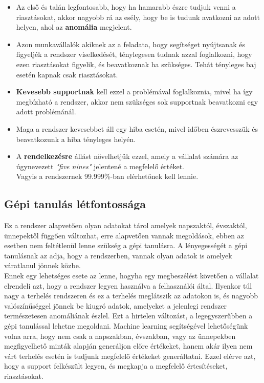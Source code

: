 \begin{itemize}
	\item Az első és talán legfontosabb, hogy ha hamarabb észre tudjuk venni a riasztásokat, akkor nagyobb rá az esély, hogy be is tudunk avatkozni az adott helyen, ahol az \textbf{anomália} megjelent.
	\item Azon munkavállalók akiknek az a feladata, hogy segítséget nyújtsanak és figyeljék a rendszer viselkedését, ténylegesen tudnak azzal foglalkozni, hogy ezen riasztásokat figyelik, és beavatkoznak ha szükséges. Tehát tényleges baj esetén kapnak csak riasztásokat.
	\item \textbf{Kevesebb supportnak} kell ezzel a problémával foglalkoznia, mivel ha így megbízható a rendszer, akkor nem szükséges sok supportnak beavatkozni egy adott problémánál.
	\item Maga a rendszer kevesebbet áll egy hiba esetén, mivel időben észrevesszük és beavatkozunk a hiba tényleges helyén.
	\item A \textbf{rendelkezésre} állást növelhetjük ezzel, amely a vállalat számára az úgynevezett \textit{"five nines"} jelentené a megfelelő értéket. \\
	Vagyis a rendszernek 99.999\%-ban elérhetőnek kell lennie.
\end{itemize}

\subsection{Gépi tanulás létfontossága}
Ez a rendszer alapvetően olyan adatokat tárol amelyek napszaktól, évszaktól, ünnepektől függően változhat, erre alapvetően vannak megoldások, ebben az esetben nem feltétlenül lenne szükség a gépi tanulásra. A lényegességét a gépi tanulásnak az adja, hogy a rendszerben, vannak olyan adatok is amelyek váratlanul jönnek közbe.
\\
Ennek egy lehetséges esete az lenne, hogyha egy megbeszélést követően a vállalat elrendeli azt, hogy a rendszer legyen használva a felhasználói által. Ilyenkor túl nagy a terhelés rendszeren és ez a terhelés meglátszik az adatokon is, és nagyobb valószínűséggel jönnek be kiugró adatok, amelyeket a jelenlegi rendszer természetesen anomáliának észlel. Ezt a hirtelen változást, a legegyszerűbben a gépi tanulással lehetne megoldani. Machine learning segítségével lehetőségünk volna arra, hogy nem csak a napszakban, évszakban, vagy az ünnepekben megfigyelhető minták alapján generáljon előre értékeket, hanem akár ilyen nem várt terhelés esetén is tudjunk megfelelő értékeket generáltatni. Ezzel elérve azt, hogy a support felkészült legyen, és megkapja a megfelelő értesítéseket, riasztásokat. 
 
